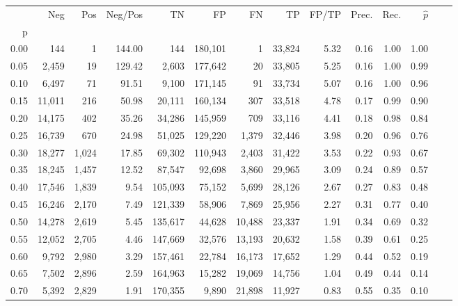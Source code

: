 \begin{tabular}{rrrrrrrrrrrrrr}
\toprule
{} &     Neg &    Pos & Neg/Pos &       TN &       FP &      FN &      TP & FP/TP & Prec. &  Rec. & $\hat{p}$ \\
p    &         &        &         &          &          &         &         &       &       &       &           \\
\midrule
0.00 &     144 &      1 &  144.00 &      144 &  180,101 &       1 &  33,824 &  5.32 &  0.16 &  1.00 &      1.00 \\
0.05 &   2,459 &     19 &  129.42 &    2,603 &  177,642 &      20 &  33,805 &  5.25 &  0.16 &  1.00 &      0.99 \\
0.10 &   6,497 &     71 &   91.51 &    9,100 &  171,145 &      91 &  33,734 &  5.07 &  0.16 &  1.00 &      0.96 \\
0.15 &  11,011 &    216 &   50.98 &   20,111 &  160,134 &     307 &  33,518 &  4.78 &  0.17 &  0.99 &      0.90 \\
0.20 &  14,175 &    402 &   35.26 &   34,286 &  145,959 &     709 &  33,116 &  4.41 &  0.18 &  0.98 &      0.84 \\
0.25 &  16,739 &    670 &   24.98 &   51,025 &  129,220 &   1,379 &  32,446 &  3.98 &  0.20 &  0.96 &      0.76 \\
0.30 &  18,277 &  1,024 &   17.85 &   69,302 &  110,943 &   2,403 &  31,422 &  3.53 &  0.22 &  0.93 &      0.67 \\
0.35 &  18,245 &  1,457 &   12.52 &   87,547 &   92,698 &   3,860 &  29,965 &  3.09 &  0.24 &  0.89 &      0.57 \\
0.40 &  17,546 &  1,839 &    9.54 &  105,093 &   75,152 &   5,699 &  28,126 &  2.67 &  0.27 &  0.83 &      0.48 \\
0.45 &  16,246 &  2,170 &    7.49 &  121,339 &   58,906 &   7,869 &  25,956 &  2.27 &  0.31 &  0.77 &      0.40 \\
0.50 &  14,278 &  2,619 &    5.45 &  135,617 &   44,628 &  10,488 &  23,337 &  1.91 &  0.34 &  0.69 &      0.32 \\
0.55 &  12,052 &  2,705 &    4.46 &  147,669 &   32,576 &  13,193 &  20,632 &  1.58 &  0.39 &  0.61 &      0.25 \\
0.60 &   9,792 &  2,980 &    3.29 &  157,461 &   22,784 &  16,173 &  17,652 &  1.29 &  0.44 &  0.52 &      0.19 \\
0.65 &   7,502 &  2,896 &    2.59 &  164,963 &   15,282 &  19,069 &  14,756 &  1.04 &  0.49 &  0.44 &      0.14 \\
0.70 &   5,392 &  2,829 &    1.91 &  170,355 &    9,890 &  21,898 &  11,927 &  0.83 &  0.55 &  0.35 &      0.10 \\

\end{tabular}

